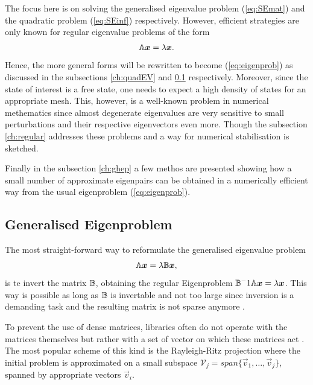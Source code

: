 The focus here is on solving the generalised eigenvalue problem (\ref{eq:SEmat}) and the quadratic problem (\ref{eq:SEinf}) respectively.
However, efficient strategies are only known for regular eigenvalue problems of the form 
\begin{equation} \label{eq:eigenprob}
\mathbb{A}\bm{x}=\lambda\bm{x}.
\end{equation}
Hence, the more general forms will be rewritten to become (\ref{eq:eigenprob}) as discussed in the subsections \ref{ch:quadEV} and \ref{ch:GenEV} respectively.
Moreover, since the state of interest is a free state, one needs to expect a high density of states for an appropriate mesh. 
This, however, is a well-known problem in numerical methematics since almost degenerate eigenvalues are very sensitive to small perturbations and their respective eigenvectors even more.
Though the subsection \ref{ch:regular} addresses these problems and a way for numerical stabilisation is sketched.

Finally in the subsection \ref{ch:ghep} a few methos are presented showing how a small number of approximate eigenpairs can be obtained in a numerically efficient way from the usual eigenproblem (\ref{eq:eigenprob}).

%

\subsection{Generalised Eigenproblem}
\label{ch:GenEV}
The most straight-forward way to reformulate the generalised eigenvalue problem
\begin{equation} \label{eq:Gep}
\mathbb{A}\bm{x}=\lambda\mathbb{B}\bm{x},
\end{equation}
is te invert the matrix $\mathbb{B}$, obtaining the regular Eigenproblem $\mathbb{B}^-1\mathbb{A}\bm{x}=\lambda\bm{x}$.
This way is possible as long as $\mathbb{B}$ is invertable and not too large since inversion is a demanding task and the resulting matrix is not sparse anymore \cite{slepcManual}.

To prevent the use of dense matrices, libraries often do not operate with the matrices themselves but rather with a set of vector on which these matrices act \cite{slepcManual}.
The most popular scheme of this kind is the Rayleigh-Ritz projection where the initial problem is approximated on a small subspace $\mathcal{V}_j=span \{\vec{v}_1,\hdots,\vec{v}_j\}$, spanned by appropriate vectors $\vec{v}_i$.

